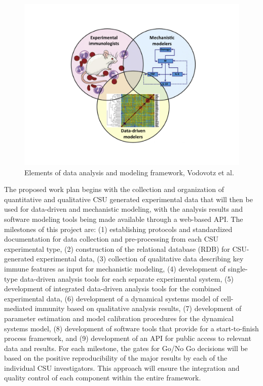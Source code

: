 \documentclass[]{book}
\begin{document}
\begin{figure}

{\centering \includegraphics[width=0.5\linewidth]{figures/Fig1_Elements} 

}

\caption{Elements of data analysis and modeling framework, Vodovotz et al.}\label{fig:framework}
\end{figure}

The proposed work plan begins with the collection and organization of
quantitative and qualitative CSU generated experimental data that will
then be used for data-driven and mechanistic modeling, with the analysis
results and software modeling tools being made available through a
web-based API. The milestones of this project are: (1) establishing
protocols and standardized documentation for data collection and
pre-processing from each CSU experimental type, (2) construction of the
relational database (RDB) for CSU-generated experimental data, (3)
collection of qualitative data describing key immune features as input
for mechanistic modeling, (4) development of single-type data-driven
analysis tools for each separate experimental system, (5) development of
integrated data-driven analysis tools for the combined experimental
data, (6) development of a dynamical systems model of cell-mediated
immunity based on qualitative analysis results, (7) development of
parameter estimation and model calibration procedures for the dynamical
systems model, (8) development of software tools that provide for a
start-to-finish process framework, and (9) development of an API for
public access to relevant data and results. For each milestone, the
gates for Go/No Go decisions will be based on the positive
reproducibility of the major results by each of the individual CSU
investigators. This approach will ensure the integration and quality
control of each component within the entire framework.
\end{document}
